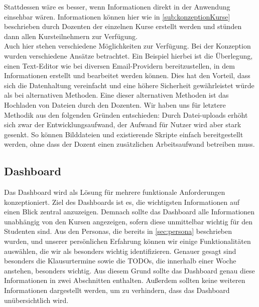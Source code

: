 Stattdessen wäre es besser, wenn Informationen direkt in der Anwendung einsehbar wären. Informationen können hier wie in \autoref{sub:konzeptionKurse} beschrieben durch Dozenten der einzelnen Kurse erstellt werden und stünden dann allen Kursteilnehmern zur Verfügung.\\
Auch hier stehen verschiedene Möglichkeiten zur Verfügung. Bei der Konzeption wurden verschiedene Ansätze betrachtet. Ein Beispiel hierbei ist die Überlegung, einen Text-Editor wie bei diversen Email-Providern bereitzustellen, in dem Informationen erstellt und bearbeitet werden können. Dies hat den Vorteil, dass sich die Datenhaltung vereinfacht und eine höhere Sicherheit gewährleistet würde als bei alternativen Methoden. Eine dieser alternativen Methoden ist das Hochladen von Dateien durch den Dozenten. 
Wir haben uns für letztere Methodik aus den folgenden Gründen entschieden:
Durch Datei-uploads erhöht sich zwar der Entwicklungsaufwand, der Aufwand für Nutzer wird aber stark gesenkt. So können Bilddateien und existierende Skripte einfach bereitgestellt werden, ohne dass der Dozent einen zusätzlichen Arbeitsaufwand betreiben muss.






\subsection{Dashboard}
Das Dashboard wird als Lösung für mehrere funktionale Anforderungen konzeptioniert.
Ziel des Dashboards ist es, die wichtigsten Informationen auf einen Blick zentral anzuzeigen.
Demnach sollte das Dashboard alle Informationen unabhängig von den Kursen angezeigen, sofern diese unmittelbar wichtig für den Studenten sind.
Aus den Personas, die bereits in \autoref{sec:persona} beschrieben wurden, und unserer persönlichen Erfahrung können wir einige Funktionalitäten auswählen, die wir als besonders wichtig identifizieren.
Genauer gesagt sind besonders die Klausurtermine sowie die TODOs, die innerhalb einer Woche anstehen, besonders wichtig.
Aus diesem Grund sollte das Dashboard genau diese Informationen in zwei Abschnitten enthalten.
Außerdem sollten keine weiteren Informationen dargestellt werden, um zu verhindern, dass das Dashboard unübersichtlich wird.


